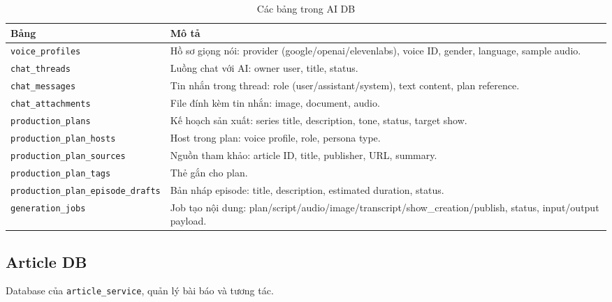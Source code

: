 \documentclass[14pt,a4paper,oneside]{extreport}
\begin{document}
\begin{table}[H]
\centering
\caption{Các bảng trong AI DB}
\label{tab:er-ai}
\renewcommand{\arraystretch}{1.3}
\small
\begin{tabularx}{\textwidth}{|l|X|}
\hline
\textbf{Bảng} & \textbf{Mô tả} \\
\hline
\texttt{voice\_profiles} & Hồ sơ giọng nói: provider (google/openai/elevenlabs), voice ID, gender, language, sample audio. \\
\hline
\texttt{chat\_threads} & Luồng chat với AI: owner user, title, status. \\
\hline
\texttt{chat\_messages} & Tin nhắn trong thread: role (user/assistant/system), text content, plan reference. \\
\hline
\texttt{chat\_attachments} & File đính kèm tin nhắn: image, document, audio. \\
\hline
\texttt{production\_plans} & Kế hoạch sản xuất: series title, description, tone, status, target show. \\
\hline
\texttt{production\_plan\_hosts} & Host trong plan: voice profile, role, persona type. \\
\hline
\texttt{production\_plan\_sources} & Nguồn tham khảo: article ID, title, publisher, URL, summary. \\
\hline
\texttt{production\_plan\_tags} & Thẻ gắn cho plan. \\
\hline
\texttt{production\_plan\_episode\_drafts} & Bản nháp episode: title, description, estimated duration, status. \\
\hline
\texttt{generation\_jobs} & Job tạo nội dung: plan/script/audio/image/transcript/show\_creation/publish, status, input/output payload. \\
\hline
\end{tabularx}
\end{table}

\subsection{Article DB}

Database của \texttt{article\_service}, quản lý bài báo và tương tác.
\end{document}
